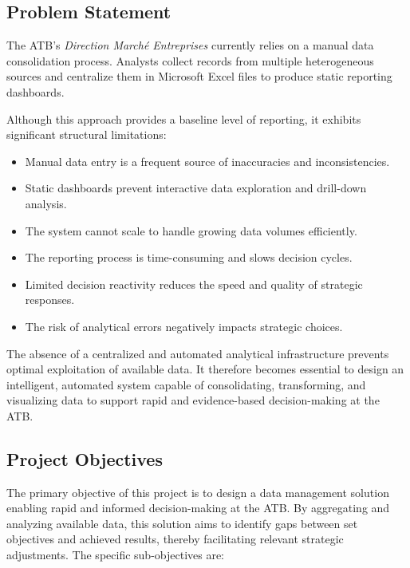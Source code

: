 \subsection{Problem Statement}

The ATB's \textit{Direction March\'{e} Entreprises} currently relies on a manual data
consolidation process. Analysts collect records from multiple heterogeneous sources and
centralize them in Microsoft Excel files to produce static reporting dashboards.

Although this approach provides a baseline level of reporting, it exhibits significant
structural limitations:

\begin{itemize}
    \item Manual data entry is a frequent source of inaccuracies and inconsistencies.
    \item Static dashboards prevent interactive data exploration and drill-down analysis.
    \item The system cannot scale to handle growing data volumes efficiently.
    \item The reporting process is time-consuming and slows decision cycles.
    \item Limited decision reactivity reduces the speed and quality of strategic responses.
    \item The risk of analytical errors negatively impacts strategic choices.
\end{itemize}

The absence of a centralized and automated analytical infrastructure prevents optimal
exploitation of available data. It therefore becomes essential to design an intelligent,
automated system capable of consolidating, transforming, and visualizing data to support
rapid and evidence-based decision-making at the ATB.

\subsection{Project Objectives}

The primary objective of this project is to design a data management solution enabling rapid
and informed decision-making at the ATB. By aggregating and analyzing available data, this
solution aims to identify gaps between set objectives and achieved results, thereby facilitating
relevant strategic adjustments. The specific sub-objectives are:

